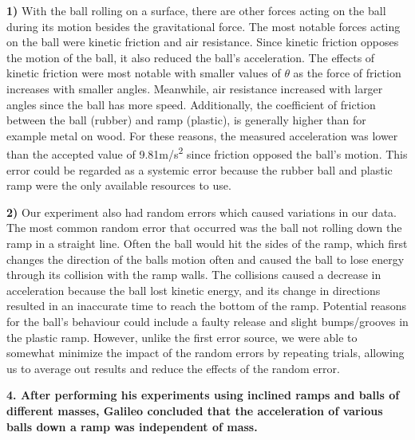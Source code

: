 \documentclass[12pt,letterpaper]{article}
\newcommand\tab[1][1cm]{\hspace*{#1}}
\begin{document}
\noindent
\begin{flushleft}
	\tab \textbf{1)} With the ball rolling on a surface, there are other forces acting on the ball during \tab its motion besides the gravitational force. The most notable forces acting on the ball \tab were kinetic friction and air resistance. Since kinetic friction opposes the motion of \tab the ball, it also reduced the ball’s acceleration. The effects of kinetic friction were \tab most notable with smaller values of  $\theta$ as the force of friction increases with smaller \tab angles. Meanwhile, air resistance increased with larger angles since the ball has more \tab speed. Additionally, the coefficient of friction between the ball (rubber) and ramp \tab (plastic), is generally higher than for example metal on wood. For these reasons, the \tab measured acceleration was lower than the accepted value of 9.81m/s\textsuperscript{2} since friction \tab opposed the ball’s motion. This error could be regarded as a systemic error because \tab the rubber ball and plastic ramp were the only available resources to use.
\end{flushleft}
\vspace{-4mm}
\noindent
\begin{flushleft}
	\tab \textbf{2)} Our experiment also had random errors which caused variations in our data. The \tab most common random error that occurred was the ball not rolling down the ramp in \tab a straight line. Often the ball would hit the sides of the ramp, which first changes \tab the direction of the balls motion often and caused the ball to lose energy through \tab its collision with the ramp walls. The collisions caused a decrease in acceleration \tab because the ball lost kinetic energy, and its change in directions resulted in an \tab inaccurate time to reach the bottom of the ramp. Potential reasons for the ball’s \tab behaviour could include a faulty release and slight bumps/grooves in the plastic \tab ramp. However, unlike the first error source, we were able to somewhat minimize the \tab impact of the random errors by repeating trials, allowing us to average out results \tab and reduce the effects of the random error.
\end{flushleft}


\vspace{8mm}
\noindent
\textbf{4. After performing his experiments using inclined ramps and balls of different masses, Galileo concluded that the acceleration of various balls down a ramp was independent of mass.}
\end{document}
